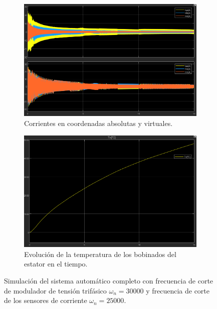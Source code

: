 \documentclass{article}
\begin{document}
\begin{figure}[htbp]
    \vspace{1em}
    \begin{subfigure}{0.45\textwidth}
        \centering
        \includegraphics[width=\textwidth]{Imagenes/Corrientes_ModuladorTNImejorado.png}
        \caption{Corrientes en coordenadas absolutas y virtuales.}
        \label{fig:Corrientes_ModuladorTNImejorado}
    \end{subfigure}
    \hfill
    \begin{subfigure}{0.45\textwidth}
        \centering
        \includegraphics[width=\textwidth]{Imagenes/Temperatura_Estator_ModuladorTNImejorado.png}
        \caption{Evolución de la temperatura de los bobinados del estator en el tiempo.}
        \label{fig:Temperatura_Estator_ModuladorTNImejorado}
    \end{subfigure}

    \caption{Simulación del sistema automático completo con frecuencia de corte de modulador de tensión trifásico \(\omega_n = 30000\) y frecuencia de corte de los sensores de corriente \(\omega_n = 25000\).}
    \label{fig:simulacion_modulador_NoIdeal_mejorado}
\end{figure}
\end{document}
